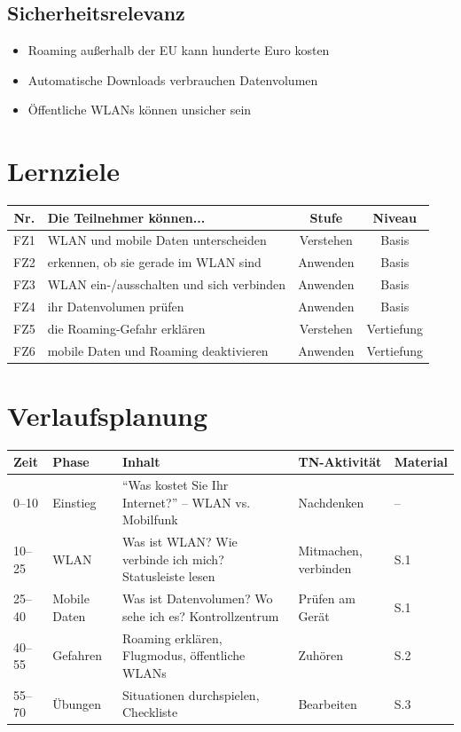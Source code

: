 \documentclass[11pt,a4paper]{article}
\begin{document}
\subsection{Sicherheitsrelevanz}
\begin{warnbox}[Kostenfallen]
\begin{itemize}
    \item Roaming außerhalb der EU kann hunderte Euro kosten
    \item Automatische Downloads verbrauchen Datenvolumen
    \item Öffentliche WLANs können unsicher sein
\end{itemize}
\end{warnbox}

\section{Lernziele}

\begin{tabular}{|c|p{7cm}|c|c|}
\hline
\textbf{Nr.} & \textbf{Die Teilnehmer können...} & \textbf{Stufe} & \textbf{Niveau} \\
\hline
FZ1 & WLAN und mobile Daten unterscheiden & Verstehen & Basis \\
FZ2 & erkennen, ob sie gerade im WLAN sind & Anwenden & Basis \\
FZ3 & WLAN ein-/ausschalten und sich verbinden & Anwenden & Basis \\
FZ4 & ihr Datenvolumen prüfen & Anwenden & Basis \\
FZ5 & die Roaming-Gefahr erklären & Verstehen & Vertiefung \\
FZ6 & mobile Daten und Roaming deaktivieren & Anwenden & Vertiefung \\
\hline
\end{tabular}

\section{Verlaufsplanung}

\begin{longtable}{|p{1cm}|p{2cm}|p{5cm}|p{3cm}|p{2cm}|}
\hline
\textbf{Zeit} & \textbf{Phase} & \textbf{Inhalt} & \textbf{TN-Aktivität} & \textbf{Material} \\
\hline
0--10 & Einstieg & ``Was kostet Sie Ihr Internet?'' -- WLAN vs. Mobilfunk & Nachdenken & -- \\
\hline
10--25 & WLAN & Was ist WLAN? Wie verbinde ich mich? Statusleiste lesen & Mitmachen, verbinden & S.1 \\
\hline
25--40 & Mobile Daten & Was ist Datenvolumen? Wo sehe ich es? Kontrollzentrum & Prüfen am Gerät & S.1 \\
\hline
40--55 & Gefahren & Roaming erklären, Flugmodus, öffentliche WLANs & Zuhören & S.2 \\
\hline
55--70 & Übungen & Situationen durchspielen, Checkliste & Bearbeiten & S.3 \\
\hline
\end{longtable}
\end{document}
